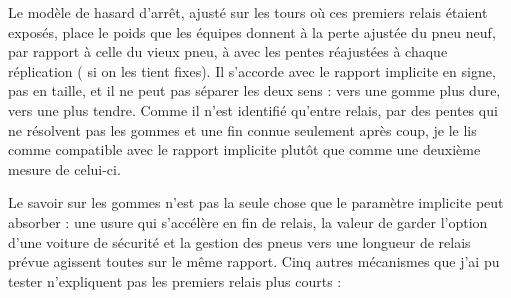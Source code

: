 \documentclass[11pt,a4paper]{article}
\begin{document}
Le modèle de hasard d'arrêt, ajusté sur les \HazardLaps{} tours où ces
\HazardStints{} premiers relais étaient exposés, place le poids que les équipes
donnent à la perte ajustée du pneu neuf, par rapport à celle du vieux pneu, à
\HazardRatio{} \HazardRatioCi{} avec les pentes réajustées à chaque réplication
(\HazardRatioCiFixed{} si on les tient fixes). Il s'accorde avec le rapport
implicite en signe, pas en taille, et il ne peut pas séparer les deux sens :
\HazardHarder{} \HazardHarderCi{} vers une gomme plus dure, \HazardSofter{}
\HazardSofterCi{} vers une plus tendre. Comme il n'est identifié qu'entre
relais, par des pentes qui ne résolvent pas les gommes et une fin connue
seulement après coup, je le lis comme compatible avec le rapport implicite
plutôt que comme une deuxième mesure de celui-ci.

Le savoir sur les gommes n'est pas la seule chose que le paramètre implicite
peut absorber : une usure qui s'accélère en fin de relais, la valeur de garder
l'option d'une voiture de sécurité et la gestion des pneus vers une longueur de
relais prévue agissent toutes sur le même rapport. Cinq autres mécanismes que
j'ai pu tester n'expliquent pas les premiers relais plus courts :
\end{document}
